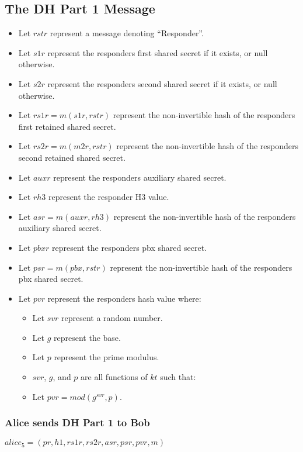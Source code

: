 \documentclass[11pt]{article}
\begin{document}
  \subsection{The DH Part 1 Message}
  \begin{itemize}
    \item Let $rstr$ represent a message denoting ``Responder''.
    \item Let $s1r$ represent the responders first shared secret
          if it exists, or null otherwise.
    \item Let $s2r$ represent the responders second shared secret
          if it exists, or null otherwise.
    \item Let $rs1r = m(s1r,rstr)$ represent the non-invertible 
          hash of the responders first retained shared secret.
    \item Let $rs2r = m(m2r,rstr)$ represent the non-invertible
          hash of the responders second retained shared secret.
    \item Let $auxr$ represent the responders auxiliary shared 
          secret.
    \item Let $rh3$ represent the responder H3 value.
    \item Let $asr = m(auxr,rh3)$ represent the non-invertible hash
          of the responders auxiliary shared secret.
    \item Let $pbxr$ represent the responders pbx shared secret.
    \item Let $psr = m(pbx,rstr)$ represent the non-invertible
          hash of the responders pbx shared secret.
    \item Let $pvr$ represent the responders hash value where:
      \begin{itemize}
        \item Let $svr$ represent a random number.
        \item Let $g$ represent the base.
        \item Let $p$ represent the prime modulus.
        \item $svr$, $g$, and $p$ are all functions of $kt$
              such that: 
        \item Let $pvr = mod(g^{svr},p)$.
      \end{itemize}
  \end{itemize}
  \subsubsection{Alice sends DH Part 1 to Bob}
  $alice_5=(pr,h1,rs1r,rs2r,asr,psr,pvr,m)$
\end{document}
